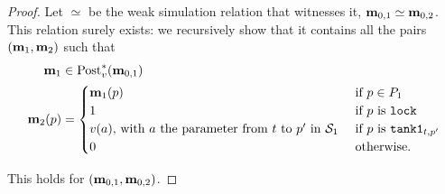 \begin{proof}
  Let $\simeq$ be the weak simulation relation that witnesses it, \ie $\mathbf{m}_{0,1} \simeq \mathbf{m}_{0,2}$.
  This relation surely exists: we recursively show that it contains all the pairs $(\mathbf{m}_1, \mathbf{m}_2)$ such that
  \begin{align*}
    \mar_1 &\in \posts[\val]{\mar_{0,1}}\\
    \mar_2(p) &= \begin{cases}
        \mar_1(p) &\text{ if } p \in \places_1\\
        1         &\text{ if } p \text{ is } \mathtt{lock} \\
        \val[a]\text{, with $a$ the parameter from $t$ to $p'$ in $\namePPN[1]$} &\text{ if $p$ is }\mathtt{tank1}_{t,p'} \\
        0 &\text{ otherwise.}
      \end{cases}
  \end{align*}

  This holds for $(\mathbf{m}_{0,1}, \mathbf{m}_{0,2})$.


\end{proof}
